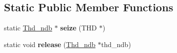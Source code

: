 \subsection*{Static Public Member Functions}
\begin{DoxyCompactItemize}
\item 
\mbox{\label{classThd__ndb_ac888469c76ec9304f573ab1ac4513da8}} 
static \mbox{\hyperlink{classThd__ndb}{Thd\+\_\+ndb}} $\ast$ {\bfseries seize} (T\+HD $\ast$)
\item 
\mbox{\label{classThd__ndb_a58406d99c96c75cd7b971607b65a0401}} 
static void {\bfseries release} (\mbox{\hyperlink{classThd__ndb}{Thd\+\_\+ndb}} $\ast$thd\+\_\+ndb)
\end{DoxyCompactItemize}

